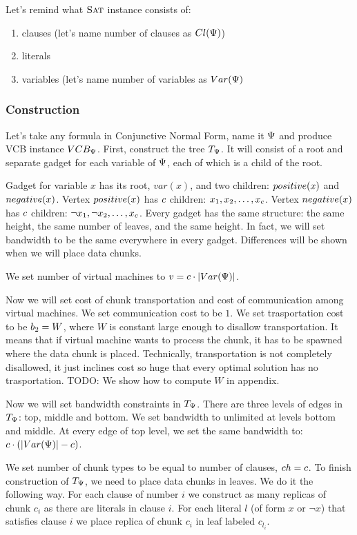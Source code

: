 Let's remind what $\textsc{Sat}$ instance consists of:
\begin{enumerate}
\item clauses (let's name number of clauses as $Cl(\Psi)$)
\item literals
\item variables (let's name number of variables as $Var(\Psi)$
\end{enumerate}

\subsubsection{Construction}
Let's take any formula in Conjunctive Normal Form, name it $\Psi$ and produce
VCB instance $VCB_{\Psi}$. First, construct the tree $T_{\Psi}$. It will consist of
a root and separate gadget for each variable of $\Psi$, each of which
is a child of the root.


Gadget for variable $x$ has its root, $var(x)$, and two children:
$positive(x)$ and $negative(x)$. Vertex $positive(x)$ has $c$
children: $x_1, x_2, \ldots, x_{c}$. Vertex $negative(x)$ has
$c$ children: $\neg x_1, \neg x_2, \dots, x_{c}$. Every
gadget has the same structure: the same height, the same number of
leaves, and the same height. In fact, we will set bandwidth to be the
same everywhere in every gadget. Differences will be shown when we
will place data chunks.

We set number of virtual machines to $v = c \cdot |Var(\Psi)|$.

Now we will set cost of chunk transportation and cost of communication
among virtual machines. We set communication cost to be $1$. We set
trasportation cost to be $b_2 = W$, where $W$ is constant large enough
to disallow transportation. It means that if virtual machine wants to
process the chunk, it has to be spawned where the data chunk is
placed. Technically, transportation is not completely disallowed, it
just inclines cost so huge that every optimal solution has no
trasportation. TODO: We show how to compute $W$ in appendix.

Now we will set bandwidth constraints in $T_{\Psi}$. There are three
levels of edges in $T_{\Psi}$: top, middle and bottom. We set
bandwidth to unlimited at levels bottom and middle. At every edge of
top level, we set the same bandwidth to: $c \cdot (|Var(\Psi)| -
c)$.

We set number of chunk types to be equal to number of clauses, $ch =
c$. To finish construction of $T_{\Psi}$, we need to place data chunks in
leaves. We do it the following way. For each clause of number $i$ we
construct as many replicas of chunk $c_i$ as there are literals in
clause $i$. For each literal $l$ (of form $x$ or $\neg x$) that satisfies clause $i$ we place
replica of chunk $c_i$ in leaf labeled $c_{l_i}$.

